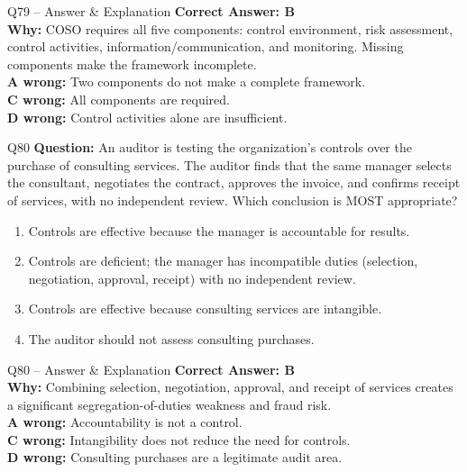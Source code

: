 \documentclass[aspectratio=169,10pt]{beamer}
\begin{document}
	\begin{frame}[t]{Q79 -- Answer \& Explanation}
		\small
		\textbf{Correct Answer: B} \\[4pt]
		\textbf{Why:} COSO requires all five components: control environment, risk assessment, control activities, information/communication, and monitoring. Missing components make the framework incomplete. \\[4pt]
		\textbf{A wrong:} Two components do not make a complete framework. \\[2pt]
		\textbf{C wrong:} All components are required. \\[2pt]
		\textbf{D wrong:} Control activities alone are insufficient.
	\end{frame}
	
	\begin{frame}[t]{Q80}
		\small
		\textbf{Question:} An auditor is testing the organization's controls over the purchase of consulting services. The auditor finds that the same manager selects the consultant, negotiates the contract, approves the invoice, and confirms receipt of services, with no independent review. Which conclusion is MOST appropriate?
		\begin{enumerate}[label=\Alph*.,itemsep=1pt,topsep=2pt]
			\item Controls are effective because the manager is accountable for results.
			\item Controls are deficient; the manager has incompatible duties (selection, negotiation, approval, receipt) with no independent review.
			\item Controls are effective because consulting services are intangible.
			\item The auditor should not assess consulting purchases.
		\end{enumerate}
	\end{frame}
	
	\begin{frame}[t]{Q80 -- Answer \& Explanation}
		\small
		\textbf{Correct Answer: B} \\[4pt]
		\textbf{Why:} Combining selection, negotiation, approval, and receipt of services creates a significant segregation-of-duties weakness and fraud risk. \\[4pt]
		\textbf{A wrong:} Accountability is not a control. \\[2pt]
		\textbf{C wrong:} Intangibility does not reduce the need for controls. \\[2pt]
		\textbf{D wrong:} Consulting purchases are a legitimate audit area.
	\end{frame}
	
\end{document}
